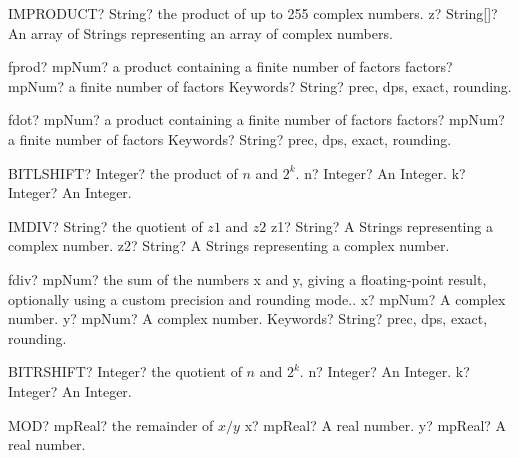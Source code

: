 \documentclass[12pt,a4paper,openany]{book}
\begin{document}
\begin{mpFunctionsExtract}
\mpWorksheetFunctionOneNotImplemented
{IMPRODUCT? String? the product of up to 255 complex numbers.}
{z? String[]? An array of Strings representing an array of complex numbers.}
\end{mpFunctionsExtract}

\begin{mpFunctionsExtract}
\mpFunctionTwo
{fprod? mpNum? a product containing a finite number of factors}
{factors? mpNum? a finite number of factors}
{Keywords? String? prec, dps, exact, rounding.}
\end{mpFunctionsExtract}

\begin{mpFunctionsExtract}
\mpFunctionTwo
{fdot? mpNum? a product containing a finite number of factors}
{factors? mpNum? a finite number of factors}
{Keywords? String? prec, dps, exact, rounding.}
\end{mpFunctionsExtract}

\begin{mpFunctionsExtract}
\mpWorksheetFunctionTwoNotImplemented
{BITLSHIFT? Integer? the product of $n$ and $2^k$.}
{n? Integer? An Integer.}
{k? Integer? An Integer.}
\end{mpFunctionsExtract}

\begin{mpFunctionsExtract}
\mpWorksheetFunctionTwoNotImplemented
{IMDIV? String? the quotient of $z1$ and $z2$}
{z1? String? A Strings representing a complex number.}
{z2? String? A Strings representing a complex number.}
\end{mpFunctionsExtract}

\begin{mpFunctionsExtract}
\mpFunctionThree
{fdiv? mpNum? the sum of the numbers x and y, giving a floating-point result, optionally using a custom precision and rounding mode..}
{x? mpNum? A complex number.}
{y? mpNum? A complex number.}
{Keywords? String? prec, dps, exact, rounding.}
\end{mpFunctionsExtract}

\begin{mpFunctionsExtract}
\mpWorksheetFunctionTwoNotImplemented
{BITRSHIFT? Integer? the quotient of $n$ and $2^k$.}
{n? Integer? An Integer.}
{k? Integer? An Integer.}
\end{mpFunctionsExtract}

\begin{mpFunctionsExtract}
\mpWorksheetFunctionTwoNotImplemented
{MOD? mpReal? the remainder of $x/y$}
{x? mpReal? A real number.}
{y? mpReal? A real number.}
\end{mpFunctionsExtract}
\end{document}
